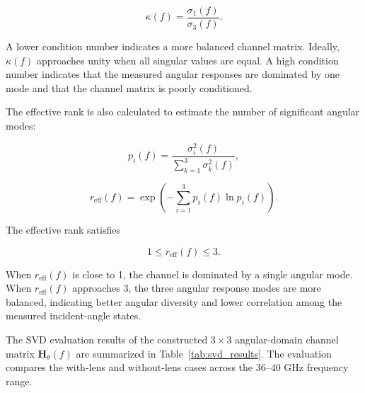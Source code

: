 \documentclass[10pt]{article}
\begin{document}
\begin{equation}
\kappa(f)
=
\frac{\sigma_1(f)}{\sigma_3(f)}.
\label{eq:condition_number}
\end{equation}

A lower condition number indicates a more balanced channel matrix. Ideally, \(\kappa(f)\) approaches
unity when all singular values are equal. A high condition number indicates that the measured
angular responses are dominated by one mode and that the channel matrix is poorly conditioned.

The effective rank is also calculated to estimate the number of significant angular modes:

\begin{equation}
p_i(f)
=
\frac{\sigma_i^2(f)}{\sum_{k=1}^{3}\sigma_k^2(f)},
\label{eq:singular_value_probability}
\end{equation}

\begin{equation}
r_{\mathrm{eff}}(f)
=
\exp
\left(
-\sum_{i=1}^{3}
p_i(f)\ln p_i(f)
\right).
\label{eq:effective_rank}
\end{equation}

The effective rank satisfies

\begin{equation}
1 \leq r_{\mathrm{eff}}(f) \leq 3.
\label{eq:effective_rank_range}
\end{equation}

When \(r_{\mathrm{eff}}(f)\) is close to 1, the channel is dominated by a single angular mode. When
\(r_{\mathrm{eff}}(f)\) approaches 3, the three angular response modes are more balanced, indicating
better angular diversity and lower correlation among the measured incident-angle states.

The SVD evaluation results of the constructed \(3\times3\) angular-domain channel matrix
\(\mathbf{H}_{\theta}(f)\) are summarized in Table~\ref{tab:svd_results}. The evaluation compares
the with-lens and without-lens cases across the 36--40 GHz frequency range.
\end{document}
